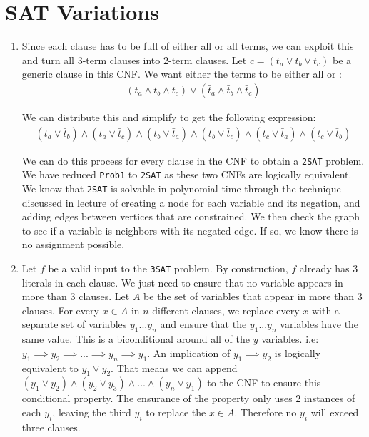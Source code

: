 \documentclass{article}
\begin{document}
\newpage
\section{SAT Variations}
\begin{enumerate}
        \item Since each clause has to be full of either all \True or all \False terms, we can exploit this and turn all 3-term clauses into 2-term clauses.
                Let $c = (t_a \lor t_b \lor t_c )$ be a generic clause in this CNF. We want either the terms to be either all \True or \False:
                \begin{align*}
                        (t_a \land t_b \land t_c) \lor (\bar{t}_a \land \bar{t}_b \land \bar{t}_c)
                \end{align*}

                We can distribute this and simplify to get the following expression:
                \begin{align*}
                        (t_a \lor \bar{t}_b) \land (t_a \lor \bar{t}_c) \land (t_b \lor \bar{t}_a)
                        \land (t_b \lor \bar{t}_c) \land (t_c \lor \bar{t}_a) \land (t_c \lor \bar{t}_b) 
                \end{align*}                
                
                We can do this process for every clause in the CNF to obtain a \texttt{2SAT} problem. 
                We have reduced \texttt{Prob1} to \texttt{2SAT} as these two CNFs are logically equivalent. We know that \texttt{2SAT} is solvable in polynomial time through the technique discussed in lecture of creating a node for each variable and its negation, and adding edges between vertices that are constrained.
                We then check the graph to see if a variable is neighbors with its negated edge. If so, we know there is no assignment possible. 

        \newpage
        \item Let $f$ be a valid input to the \texttt{3SAT} problem. By construction, $f$ already has 3 literals in each clause.
                We just need to ensure that no variable appears in more than 3 clauses. Let $A$ be the set of variables that appear in more than 3 clauses.
                For every $x \in A$ in $n$ different clauses, we replace every $x$ with a separate set of variables $y_{1} ... y_n$ and ensure that the $y_1 ... y_n$ variables have the same value.
                This is a biconditional around all of the $y$ variables. i.e: $y_{1} \implies y_2 \implies ... \implies y_n \implies y_1$. 
                An implication of $y_1 \implies y_2$ is logically equivalent to $\bar{y}_1 \lor y_2$. That means we can append $(\bar{y}_1 \lor y_2) \land (\bar{y}_2 \lor y_3) \land ... \land (\bar{y}_n \lor y_1)$ to the CNF to ensure this conditional property.
                The ensurance of the property only uses 2 instances of each $y_i$, leaving the third $y_i$ to replace the $x \in A$. Therefore no $y_i$ will exceed three clauses.


\end{enumerate}
\end{document}
